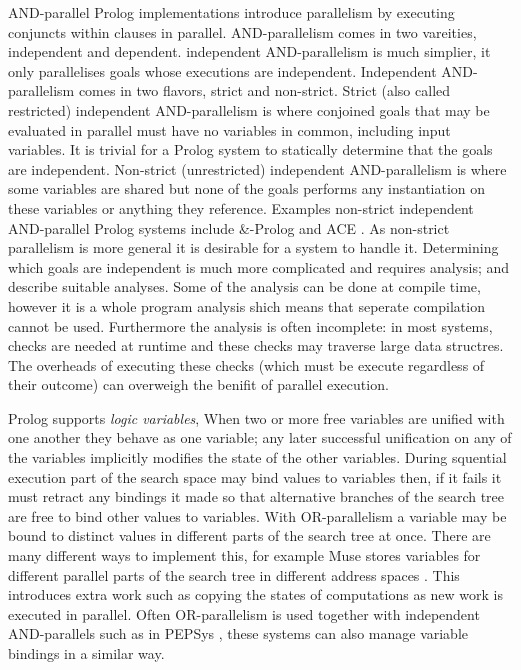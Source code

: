 AND-parallel Prolog implementations introduce parallelism by executing
conjuncts within clauses in parallel.
AND-parallelism comes in two vareities, independent and dependent.
independent AND-parallelism is much simplier, it only parallelises goals
whose executions are independent.
Independent AND-parallelism comes in two flavors, strict and non-strict.
Strict (also called restricted) independent AND-parallelism is where
conjoined goals that may be evaluated in parallel must have no variables in
common, including input variables.
It is trivial for a Prolog system to statically determine that the goals are
independent.
Non-strict (unrestricted) independent AND-parallelism is where some variables
are shared but none of the goals performs any instantiation on these variables
or anything they reference.
Examples non-strict independent AND-parallel Prolog systems include \&-Prolog 
\citep{Hermenegildo:1991:and-parallel,
DBLP:journals/jlp/MuthukumarBBH99}
and ACE \citep{gupta:1991:ace}.
As non-strict parallelism is more general it is desirable for a system to
handle it.
Determining which goals are independent is much more complicated and
requires analysis;
\citet{DBLP:journals/tcs/GrasH09} and \citet{Hermenegildo1995} describe
suitable analyses.
Some of the analysis can be done at compile time,
however it is a whole program analysis shich means that seperate compilation
cannot be used.
Furthermore the analysis is often incomplete:
in most systems, checks are needed at runtime and these checks may traverse
large data structres.
The overheads of executing these checks
(which must be execute regardless of their outcome)
can overweigh the benifit of parallel execution.

Prolog supports \emph{logic variables},
When two or more free variables are unified with one another they behave as one
variable;
any later successful unification on any of the variables implicitly modifies
the state of the other variables.
During squential execution
part of the search space may bind values to variables then,
if it fails it must retract any bindings it made so that alternative
branches of the search tree are free to bind other values to variables.
With OR-parallelism a variable may be bound to distinct values in different
parts of the search tree at once.
There are many different ways to implement this,
for example Muse stores variables for different parallel parts of the search
tree in different address spaces \citep{ali:1990:muse}.
This introduces extra work such as copying the states of computations as new
work is executed in parallel.
Often OR-parallelism is used together with independent AND-parallels
such as in PEPSys \citep{baron:1988:pepsys},
these systems can also manage variable bindings in a similar way.

